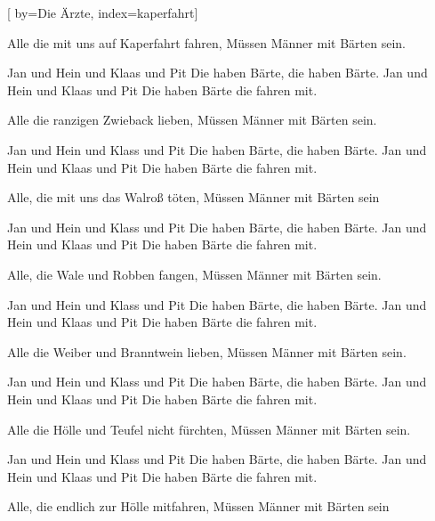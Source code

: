 

[%
    by={Die \"{A}rzte},
    index={kaperfahrt}]


    \label{kaperfahrt}

    \beginverse
        Alle die mit uns auf Kaperfahrt fahren,
        M\"{u}ssen M\"{a}nner mit B\"{a}rten sein.
    \endverse

    \beginchorus
        Jan und Hein und Klaas und Pit
        Die haben B\"{a}rte, die haben B\"{a}rte.
        Jan und Hein und Klaas und Pit
        Die haben B\"{a}rte die fahren mit.
    \endchorus

    \beginverse
        Alle die ranzigen Zwieback lieben,
        M\"{u}ssen M\"{a}nner mit B\"{a}rten sein.
    \endverse

    \beginchorus
        Jan und Hein und Klass und Pit
        Die haben B\"{a}rte, die haben B\"{a}rte.
        Jan und Hein und Klaas und Pit
        Die haben B\"{a}rte die fahren mit.
    \endchorus

    \beginverse
        Alle, die mit uns das Walro\ss{} t\"{o}ten,
        M\"{u}ssen M\"{a}nner mit B\"{a}rten sein
    \endverse

    \beginchorus
        Jan und Hein und Klass und Pit
        Die haben B\"{a}rte, die haben B\"{a}rte.
        Jan und Hein und Klaas und Pit
        Die haben B\"{a}rte die fahren mit.
    \endchorus

    \beginverse
        Alle, die Wale und Robben fangen,
        M\"{u}ssen M\"{a}nner mit B\"{a}rten sein.
    \endverse

    \beginchorus
        Jan und Hein und Klass und Pit
        Die haben B\"{a}rte, die haben B\"{a}rte.
        Jan und Hein und Klaas und Pit
        Die haben B\"{a}rte die fahren mit.
    \endchorus

    \beginverse
        Alle die Weiber und Branntwein lieben,
        M\"{u}ssen M\"{a}nner mit B\"{a}rten sein.
    \endverse

    \beginchorus
        Jan und Hein und Klass und Pit
        Die haben B\"{a}rte, die haben B\"{a}rte.
        Jan und Hein und Klaas und Pit
        Die haben B\"{a}rte die fahren mit.
    \endchorus

    \beginverse
        Alle die H\"{o}lle und Teufel nicht f\"{u}rchten,
        M\"{u}ssen M\"{a}nner mit B\"{a}rten sein.
    \endverse

    \beginchorus
        Jan und Hein und Klass und Pit
        Die haben B\"{a}rte, die haben B\"{a}rte.
        Jan und Hein und Klaas und Pit
        Die haben B\"{a}rte die fahren mit.
    \endchorus

    \beginverse
        Alle, die endlich zur H\"{o}lle mitfahren,
        M\"{u}ssen M\"{a}nner mit B\"{a}rten sein
    \endverse
\endsong
